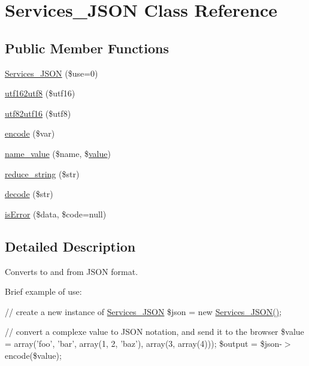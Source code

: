 \hypertarget{class_services___j_s_o_n}{\section{Services\+\_\+\+J\+S\+O\+N Class Reference}
\label{class_services___j_s_o_n}
}
\subsection*{Public Member Functions}
\begin{DoxyCompactItemize}
\item 
\hyperlink{class_services___j_s_o_n_abc84bd855fe129a4c68bcb68b4d17108}{Services\+\_\+\+J\+S\+O\+N} (\$use=0)
\item 
\hyperlink{class_services___j_s_o_n_aa7b1b36cd3a4995bbb60f5def6a216e2}{utf162utf8} (\$utf16)
\item 
\hyperlink{class_services___j_s_o_n_af9687bbf6bcddc9c847d608f9a1fa4c0}{utf82utf16} (\$utf8)
\item 
\hyperlink{class_services___j_s_o_n_acdf1c85111e34b3048d436228bf39819}{encode} (\$var)
\item 
\hyperlink{class_services___j_s_o_n_aa7f3e18209717e584f01f53a0325e9ff}{name\+\_\+value} (\$name, \$\hyperlink{1__chat_8tpl_8php_afcc7a4b78ecd8fa7e713f8cfa0f51017}{value})
\item 
\hyperlink{class_services___j_s_o_n_ae463a3baa44e95fa5b5151ab2334df1c}{reduce\+\_\+string} (\$str)
\item 
\hyperlink{class_services___j_s_o_n_a4afbb486f4a5ff5a8170c832f5997986}{decode} (\$str)
\item 
\hyperlink{class_services___j_s_o_n_a55ae0955466c3970507b122f3f5d1b38}{is\+Error} (\$data, \$code=null)
\end{DoxyCompactItemize}


\subsection{Detailed Description}
Converts to and from J\+S\+O\+N format.

Brief example of use\+:

{\ttfamily  // create a new instance of \hyperlink{class_services___j_s_o_n}{Services\+\_\+\+J\+S\+O\+N} \$json = new \hyperlink{class_services___j_s_o_n_abc84bd855fe129a4c68bcb68b4d17108}{Services\+\_\+\+J\+S\+O\+N()};}

{\ttfamily // convert a complexe value to J\+S\+O\+N notation, and send it to the browser \$value = array('foo', 'bar', array(1, 2, 'baz'), array(3, array(4))); \$output = \$json-\/$>$encode(\$value);}

